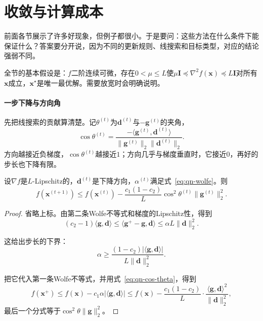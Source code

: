 \section{收敛与计算成本}
\label{sec:qn-convergence}

前面各节展示了许多好现象，但例子都很小。于是要问：这些方法在什么条件下能保证什么？答案要分开说，因为不同的更新规则、线搜索和目标类型，对应的结论强弱不同。

全节的基本假设是：$f$二阶连续可微，存在$0<\mu\leq L$使$\mu\bm{I}\preceq\nabla^2f(\bm{x})\preceq L\bm{I}$对所有$\bm{x}$成立，$\bm{x}^\star$是唯一最优解。需要放宽时会明确说明。

\paragraph{一步下降与方向角}
先把线搜索的贡献算清楚。记$\theta^{(t)}$为$\bm{d}^{(t)}$与$-\bm{g}^{(t)}$的夹角，
\begin{equation}
 \cos\theta^{(t)}=\frac{-\langle\bm{g}^{(t)},\bm{d}^{(t)}\rangle}{\lVert\bm{g}^{(t)}\rVert_2\lVert\bm{d}^{(t)}\rVert_2}.
 \label{eq:qn-cos-theta}
\end{equation}
方向越接近负梯度，$\cos\theta^{(t)}$越接近$1$；方向几乎与梯度垂直时，它接近$0$，再好的步长也下降有限。

\begin{lemma}[Wolfe线搜索的一步下降]
\label{lem:qn-one-step}
设$\nabla f$是$L$-Lipschitz的，$\bm{d}^{(t)}$是下降方向，$\alpha^{(t)}$满足式~\eqref{eq:qn-wolfe}。则
\begin{equation}
 f(\bm{x}^{(t+1)})\leq f(\bm{x}^{(t)})-\frac{c_1(1-c_2)}{L}\cos^2\theta^{(t)}\lVert\bm{g}^{(t)}\rVert_2^2.
 \label{eq:qn-one-step}
\end{equation}
\end{lemma}

\begin{proof}
省略上标。由第二条Wolfe不等式和梯度的Lipschitz性，得到
\[
 (c_2-1)\langle\bm{g},\bm{d}\rangle\leq\langle\bm{g}^{+}-\bm{g},\bm{d}\rangle\leq\alpha L\lVert\bm{d}\rVert_2^2.
\]

这给出步长的下界：
\[
 \alpha\geq\frac{(1-c_2)\lvert\langle\bm{g},\bm{d}\rangle\rvert}{L\lVert\bm{d}\rVert_2^2}.
\]

把它代入第一条Wolfe不等式，并用式~\eqref{eq:qn-cos-theta}，得到
\[
 f(\bm{x}^{+})\leq f(\bm{x})-c_1\alpha\lvert\langle\bm{g},\bm{d}\rangle\rvert
 \leq f(\bm{x})-\frac{c_1(1-c_2)}{L}\cdot\frac{\langle\bm{g},\bm{d}\rangle^2}{\lVert\bm{d}\rVert_2^2},
\]
最后一个分式等于$\cos^2\theta\lVert\bm{g}\rVert_2^2$。
\end{proof}

